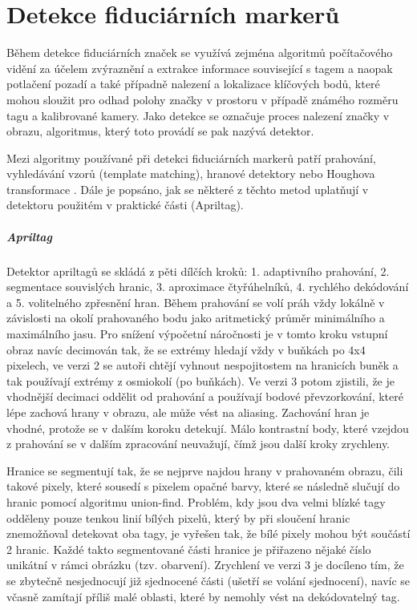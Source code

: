\chapter{Detekce fiduciárních markerů} \label{chap:detection}
  Během detekce fiduciárních značek se využívá zejména algoritmů počítačového vidění za účelem zvýraznění a extrakce informace související s tagem a naopak potlačení pozadí a také případně nalezení a lokalizace klíčových bodů, které mohou sloužit pro odhad polohy značky v prostoru v případě známého rozměru tagu a kalibrované kamery. Jako detekce se označuje proces nalezení značky v obrazu, algoritmus, který toto provádí se pak nazývá detektor.

  Mezi algoritmy používané při detekci fiduciárních markerů patří prahování, vyhledávání vzorů (template matching), hranové detektory \cite{apriltag2} nebo Houghova transformace \cite{Shabalina2019}. Dále je popsáno, jak se některé z těchto metod uplatňují v detektoru použitém v praktické části (Apriltag).

  \paragraph{Apriltag} Detektor apriltagů se skládá z pěti dílčích kroků: 1. adaptivního prahování, 2. segmentace souvislých hranic, 3. aproximace čtyřúhelníků, 4. rychlého dekódování a 5. volitelného zpřesnění hran. Během prahování se volí práh vždy lokálně v závislosti na okolí prahovaného bodu jako aritmetický průměr minimálního a maximálního jasu. Pro snížení výpočetní náročnosti je v tomto kroku vstupní obraz navíc decimován tak, že se extrémy hledají vždy v buňkách po 4x4 pixelech, ve verzi 2 \cite{apriltag2} se autoři chtějí vyhnout nespojitostem na hranicích buněk a tak používají extrémy z osmiokolí (po buňkách). Ve verzi 3 \cite{apriltag3} potom zjistili, že je vhodnější decimaci oddělit od prahování a používají bodové převzorkování, které lépe zachová hrany v obrazu, ale může vést na aliasing. Zachování hran je vhodné, protože se v dalším koroku detekují. Málo kontrastní body, které vzejdou z prahování se v dalším zpracování neuvažují, čímž jsou další kroky zrychleny. %

  Hranice se segmentují tak, že se nejprve najdou hrany v prahovaném obrazu, čili takové pixely, které sousedí s pixelem opačné barvy, které se následně slučují do hranic pomocí algoritmu union-find. Problém, kdy jsou dva velmi blízké tagy odděleny pouze tenkou linií bílých pixelů, který by při sloučení hranic znemožňoval detekovat oba tagy, je vyřešen tak, že bílé pixely mohou být součástí 2 hranic. Každé takto segmentované části hranice je přiřazeno nějaké číslo unikátní v rámci obrázku (tzv. obarvení). \cite{apriltag2} Zrychlení ve verzi 3 je docíleno tím, že se zbytečně nesjednocují již sjednocené části (ušetří se volání sjednocení), navíc se včasně zamítají příliš malé oblasti, které by nemohly vést na dekódovatelný tag. \cite{apriltag3}

